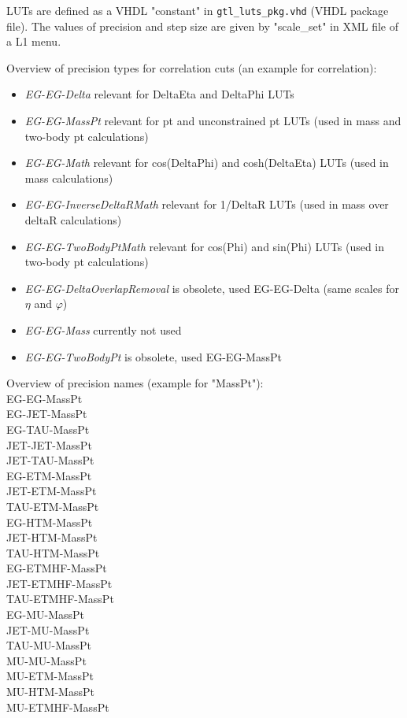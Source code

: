 LUTs are defined as a VHDL "constant" in \texttt{gtl\_luts\_pkg.vhd} (VHDL package file).
The values of precision and step size are given by "scale\_set" in XML file of a L1 menu.

Overview of precision types for correlation cuts (an example for \egamma \egamma correlation):
\begin{itemize}
\item \textit{EG-EG-Delta} relevant for DeltaEta and DeltaPhi LUTs
\item \textit{EG-EG-MassPt} relevant for pt and unconstrained pt LUTs (used in mass and two-body pt calculations)
\item \textit{EG-EG-Math} relevant for cos(DeltaPhi) and cosh(DeltaEta) LUTs (used in mass calculations)
\item \textit{EG-EG-InverseDeltaRMath} relevant for 1/DeltaR LUTs (used in mass over deltaR calculations)
\item \textit{EG-EG-TwoBodyPtMath} relevant for cos(Phi) and sin(Phi) LUTs (used in two-body pt calculations)
\item \textit{EG-EG-DeltaOverlapRemoval} is obsolete, used EG-EG-Delta (same scales for $\eta$ and $\varphi$)
\item \textit{EG-EG-Mass} currently not used
\item \textit{EG-EG-TwoBodyPt} is obsolete, used EG-EG-MassPt
\end{itemize}

Overview of precision names (example for "MassPt"):\\
EG-EG-MassPt\\
EG-JET-MassPt\\
EG-TAU-MassPt\\
JET-JET-MassPt\\
JET-TAU-MassPt\\
EG-ETM-MassPt\\
JET-ETM-MassPt\\
TAU-ETM-MassPt\\
EG-HTM-MassPt\\
JET-HTM-MassPt\\
TAU-HTM-MassPt\\
EG-ETMHF-MassPt\\
JET-ETMHF-MassPt\\
TAU-ETMHF-MassPt\\
EG-MU-MassPt\\
JET-MU-MassPt\\
TAU-MU-MassPt\\
MU-MU-MassPt\\
MU-ETM-MassPt\\
MU-HTM-MassPt\\
MU-ETMHF-MassPt\\

